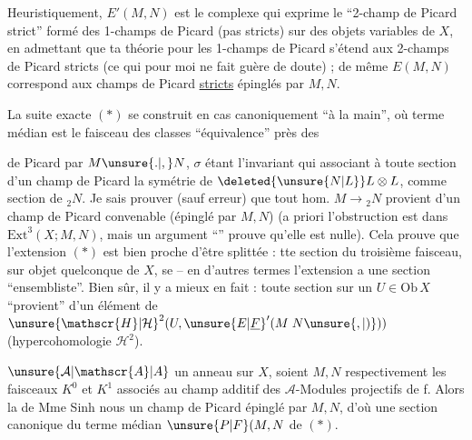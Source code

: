 Heuristiquement, $E'(M,N)$ est le complexe qui exprime le ``2-champ de Picard strict'' formé des 1-champs de Picard (pas  stricts)  sur des objets variables de $X$, en admettant que ta théorie pour les 1-champs de Picard  s'étend aux 2-champs de Picard stricts (ce qui pour moi ne fait guère de doute) ; de même $E(M,N)$ correspond aux champs de Picard \uline{stricts} épinglés par $M,N$.

La suite exacte $(*)$ se construit en  cas canoniquement ``à la main'', où  terme médian est le faisceau des classes  ``équivalence'' près des


\margin{\mbox{-- --}}

 de Picard  par $M\unsure{.|,}N$, $\sigma$ étant l'invariant qui  associant à toute section  d'un champ de Picard la symétrie de $\deleted{\unsure{N|L}}L\otimes L$,  comme section de ${}_{2}N$. Je sais prouver (sauf erreur) que tout hom. $M\to{}_{2}N$ provient d'un champ de Picard convenable (épinglé par $M,N$) (a priori l'obstruction est dans $\mathrm{Ext}^{3}(X;M,N)$, mais un argument ``'' prouve qu'elle est nulle). Cela prouve que l'extension $(*)$ est bien proche d'être splittée :  tte section du troisième faisceau, sur  objet quelconque de $X$, se  -- en d'autres termes l'extension a une section ``ensembliste''. Bien sûr, il y a mieux en fait : toute section sur un $U\in\mathrm{Ob}\,X$ ``provient'' d'un élément de ${\unsure{\mathscr{H}|\mathcal{H}}}^{2}(U,{\unsure{E|\underline{F}}}'(M\;N\unsure{,|)}))$ (hypercohomologie $\mathscr{H}^{2}$).



\uline{}\unsure{:|,}  $\unsure{\mathcal{A}|\mathscr{A}|A}$ un anneau sur $X$, soient $M,N$ respectivement les faisceaux $K^{0}$ et $K^{1}$ associés au champ additif des $\mathcal{A}$-Modules projectifs de  f.  Alors la  de Mme Sinh nous  un champ de Picard épinglé par $M,N$, d'où une section  canonique du terme médian $\unsure{P|F}(M,N$ de $(*)$.

